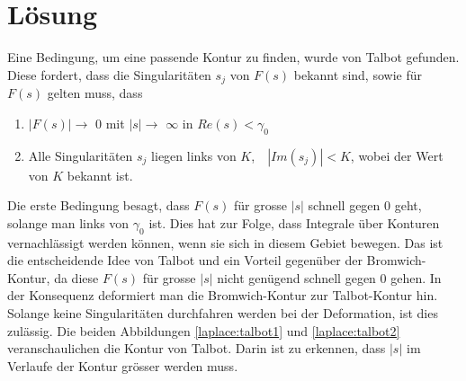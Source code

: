 %
%
%


\section{Lösung}
\label{laplace:section:Methode nach Talbot}
Eine Bedingung, um eine passende Kontur zu finden, wurde von Talbot gefunden.
Diese fordert, dass die Singularitäten $s_{j}$ von $F(s)$ bekannt sind, sowie für $F(s)$ gelten muss, dass
\begin{enumerate}
\item
$|F(s)|\rightarrow$ $0$ mit $|s|\rightarrow$ $\infty$ in $Re(s)<\gamma_{0}$
\item
Alle Singularitäten $s_{j}$ liegen links von $K$,~~$|Im(s_{j})|<K$, wobei der Wert von $K$ bekannt ist.
\end{enumerate}

Die erste Bedingung besagt, dass $F(s)$ für grosse $|s|$ schnell gegen $0$ geht, solange man links von $\gamma_{0}$ ist. Dies hat zur Folge, dass Integrale über Konturen vernachlässigt werden können, wenn sie sich in diesem Gebiet bewegen. Das ist die entscheidende Idee von Talbot und ein Vorteil gegenüber der Bromwich-Kontur, da diese $F(s)$ für grosse $|s|$ nicht genügend schnell gegen $0$ gehen. In der Konsequenz deformiert man die Bromwich-Kontur zur Talbot-Kontur hin. Solange keine Singularitäten durchfahren werden bei der Deformation, ist dies zulässig. Die beiden Abbildungen \ref{laplace:talbot1} und \ref{laplace:talbot2} veranschaulichen die Kontur von Talbot. Darin ist zu erkennen, dass $|s|$ im Verlaufe der Kontur grösser werden muss. 

